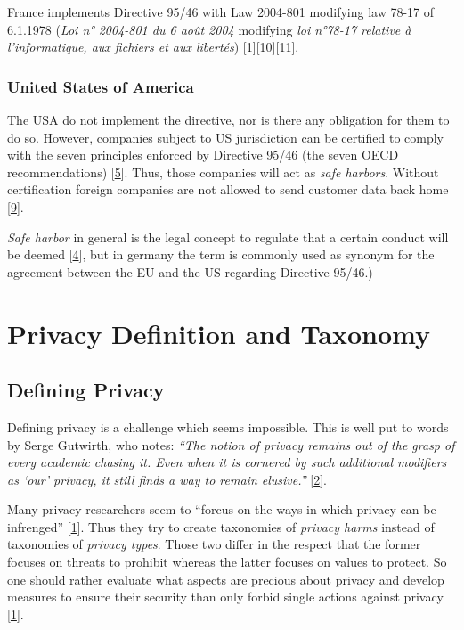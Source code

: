 France implements Directive 95/46 with Law 2004-801 modifying law 78-17 of 6.1.1978 (\emph{Loi n° 2004-801 du 6 août 2004} modifying \emph{loi n°78-17 relative à l'informatique, aux fichiers et aux libertés}) {[}\hyperref[references]{1}{]}{[}\hyperref[references]{10}{]}{[}\hyperref[references]{11}{]}.

\subsubsection*{United States of America}

The USA do not implement the directive, nor is there any obligation for them to do so.
However, companies subject to US jurisdiction can be certified to comply with the seven principles enforced by Directive 95/46 (the seven OECD recommendations) {[}\hyperref[references]{5}{]}.
Thus, those companies will act as \emph{safe harbors}. Without certification foreign companies are not allowed to send customer data back home {[}\hyperref[references]{9}{]}.

\emph{Safe harbor} in general is the legal concept to regulate that a certain conduct will be deemed {[}\hyperref[references]{4}{]}, but in germany the term is commonly used as synonym for the agreement between the EU and the US regarding Directive 95/46.)

\section{Privacy Definition and Taxonomy}
\label{sec:taxonomy}

\subsection{Defining Privacy}

Defining privacy is a challenge which seems impossible. This is well put to words by Serge Gutwirth, who notes: \emph{``The notion of privacy remains out of the grasp of every academic chasing it. Even when it is cornered by such additional modifiers as `our' privacy, it still finds a way to remain elusive.''} {[}\hyperref[references]{2}{]}.

Many privacy researchers seem to ``forcus on the ways in which privacy can be infrenged'' {[}\hyperref[references]{1}{]}.
Thus they try to create taxonomies of \emph{privacy harms} instead of taxonomies of \emph{privacy types}.
Those two differ in the respect that the former focuses on threats to prohibit whereas the latter focuses on values to protect.
So one should rather evaluate what aspects are precious about privacy and develop measures to ensure their security than only forbid single actions against privacy {[}\hyperref[references]{1}{]}.

